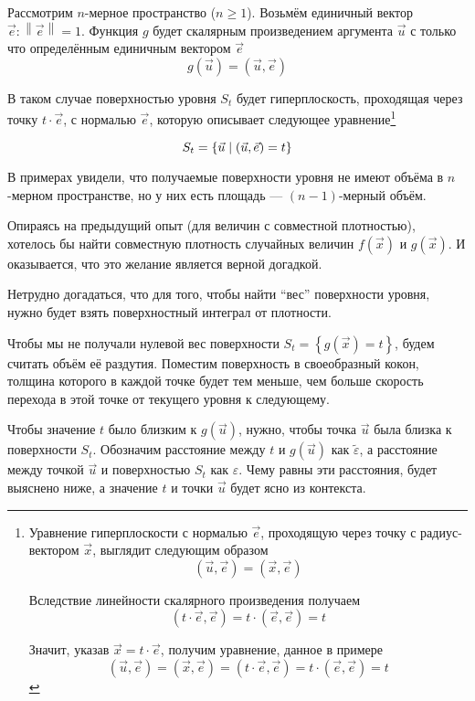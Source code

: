 \begin{example}
    Рассмотрим $n$-мерное пространство ($n \ge 1$).
    Возьмём единичный вектор $\vec{e}: \left\| \vec{e} \right\| = 1$.
    Функция $g$ будет скалярным произведением аргумента $\vec{u}$
    с только что определённым единичным вектором $\vec{e}$
        $$g\left( \vec{u} \right) = \left( \vec{u}, \vec{e} \right)$$

    В таком случае поверхностью уровня $S_t$ будет гиперплоскость,
    проходящая через точку $t \cdot \vec{e}$, с нормалью $\vec{e}$,
    которую описывает следующее уравнение\footnote{
        Уравнение гиперплоскости с нормалью $\vec{e}$,
        проходящую через точку с радиус-вектором $\vec{x}$,
        выглядит следующим образом
        $$\left( \vec{u}, \vec{e} \right) = \left( \vec{x}, \vec{e} \right)$$

        Вследствие линейности скалярного произведения получаем
        $$\left( t \cdot \vec{e}, \vec{e} \right)
            = t \cdot \left( \vec{e}, \vec{e} \right) = t$$

        Значит, указав $\vec{x} = t \cdot \vec{e}$, получим уравнение,
        данное в примере
        $$\left( \vec{u}, \vec{e} \right)
            = \left( \vec{x}, \vec{e} \right)
            = \left( t \cdot \vec{e}, \vec{e} \right)
            = t \cdot \left( \vec{e}, \vec{e} \right) = t$$}

    $$S_t = \left\{ \vec{u} \;\middle|\; \left( \vec{u}, \vec{e} \right) = t \right\}$$
\end{example}

В примерах увидели, что получаемые поверхности уровня не имеют объёма
в $n$-мерном пространстве, но у них есть площадь --- $(n-1)$-мерный объём.

Опираясь на предыдущий опыт (для величин с совместной плотностью),
хотелось бы найти совместную плотность случайных величин
$f\left( \vec{x} \right)$ и $g\left( \vec{x} \right)$.
И оказывается, что это желание является верной догадкой.

Нетрудно догадаться, что для того, чтобы найти ``вес'' поверхности уровня,
нужно будет взять поверхностный интеграл от плотности.

Чтобы мы не получали нулевой вес поверхности
$S_t = \left\{ g\left( \vec{x} \right) = t \right\}$,
будем считать объём её раздутия.
Поместим поверхность в своеобразный кокон,
толщина которого в каждой точке будет тем меньше,
чем больше скорость перехода в этой точке от текущего уровня к следующему.

Чтобы значение $t$ было близким к $g\left( \vec{u} \right)$,
нужно, чтобы точка $\vec{u}$ была близка к поверхности $S_t$.
Обозначим расстояние между $t$ и $g\left( \vec{u} \right)$
как $\tilde{\varepsilon}$,
а расстояние между точкой $\vec{u}$ и поверхностью $S_t$
как $\varepsilon$. Чему равны эти расстояния, будет выяснено ниже,
а значение $t$ и точки $\vec{u}$ будет ясно из контекста.


